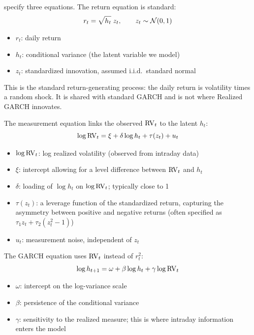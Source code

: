 \citet{hansen2012realized} specify three equations. The return equation
is standard:
%
\begin{equation}
\label{eq:rgarch-return}
r_t = \sqrt{h_t}\; z_t, \qquad z_t \sim \mathcal{N}(0,1)
\end{equation}
%
\begin{itemize}[nosep]
  \item $r_t$: daily return
  \item $h_t$: conditional variance (the latent variable we model)
  \item $z_t$: standardized innovation, assumed i.i.d.\ standard normal
\end{itemize}

This is the standard return-generating process: the daily return is volatility times
a random shock. It is shared with standard GARCH and is not where Realized GARCH
innovates.

The measurement equation links the observed $\operatorname{RV}_t$ to the latent $h_t$:
%
\begin{equation}
\label{eq:rgarch-measurement}
\log \operatorname{RV}_t = \xi + \delta \log h_t + \tau(z_t) + u_t
\end{equation}
%
\begin{itemize}[nosep]
  \item $\log \operatorname{RV}_t$: log realized volatility (observed from intraday data)
  \item $\xi$: intercept allowing for a level difference between $\operatorname{RV}_t$ and $h_t$
  \item $\delta$: loading of $\log h_t$ on $\log \operatorname{RV}_t$; typically close to 1
  \item $\tau(z_t)$: a leverage function of the standardized return, capturing the
        asymmetry between positive and negative returns (often specified as
        $\tau_1 z_t + \tau_2(z_t^2 - 1)$)
  \item $u_t$: measurement noise, independent of $z_t$
\end{itemize}

The GARCH equation uses $\operatorname{RV}_t$ instead of $r^2_t$:
%
\begin{equation}
\label{eq:rgarch-garch}
\log h_{t+1} = \omega + \beta \log h_t + \gamma \log \operatorname{RV}_t
\end{equation}
%
\begin{itemize}[nosep]
  \item $\omega$: intercept on the log-variance scale
  \item $\beta$: persistence of the conditional variance
  \item $\gamma$: sensitivity to the realized measure; this is where intraday
        information enters the model
\end{itemize}

